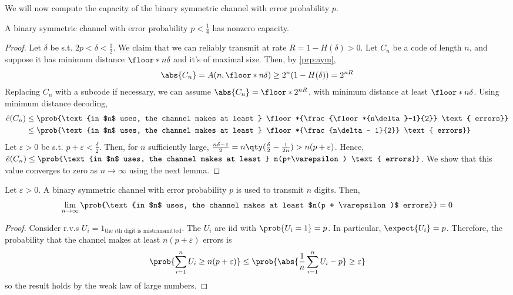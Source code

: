 We will now compute the capacity of the binary symmetric channel with error probability $p$.

\begin{proposition}
    A binary symmetric channel with error probability $p < \frac{1}{4}$ has nonzero capacity.
\end{proposition}

\begin{proof}
    Let $\delta$ be s.t. $2p < \delta < \frac{1}{2}$.
    We claim that we can reliably transmit at rate $R = 1 - H(\delta) > 0$.
    Let $C_n$ be a code of length $n$, and suppose it has minimum distance $\floor*{n\delta}$ and it's of maximal size.
    Then, by \cref{prp:aym},
    \begin{align*}
        \abs{C_n} = A(n, \floor*{n\delta}) \geq 2^n(1-H(\delta)) = 2^{nR}
    \end{align*}
    Replacing $C_n$ with a subcode if necessary, we can assume $\abs{C_n} = \floor*{2^{nR}}$, with minimum distance at least $\floor*{n\delta}$.
    Using minimum distance decoding,
    \begin{align*}
        \hat e(C_n) &\leq \prob{\text{in $n$ uses, the channel makes at least } \floor*{\frac{\floor*{n\delta}-1}{2}} \text{ errors}} \\
        &\leq \prob{\text{in $n$ uses, the channel makes at least } \floor*{\frac{n\delta - 1}{2}} \text{ errors}}
    \end{align*}
    Let $\varepsilon > 0$ be s.t. $p + \varepsilon < \frac{\delta}{2}$.
    Then, for $n$ sufficiently large, $\frac{n\delta - 1}{2} = n\qty(\frac{\delta}{2} - \frac{1}{2n}) > n(p + \varepsilon)$.
    Hence, $\hat e(C_n) \leq \prob{\text{in $n$ uses, the channel makes at least } n(p+\varepsilon) \text{ errors}}$.
    We show that this value converges to zero as $n \to \infty$ using the next lemma.
\end{proof}

\begin{lemma} \label{lem:9.5}
    Let $\varepsilon > 0$.
    A binary symmetric channel with error probability $p$ is used to transmit $n$ digits.
    Then,
    \begin{align*}
        \lim_{n \to \infty} \prob{\text{in $n$ uses, the channel makes at least $n(p + \varepsilon)$ errors}} = 0
    \end{align*}
\end{lemma}

\begin{proof}
    Consider r.v.s $U_i = 1_\text{the $i$th digit is mistransmitted}$.
    The $U_i$ are iid with $\prob{U_i = 1} = p$.
    In particular, $\expect{U_i} = p$.
    Therefore, the probability that the channel makes at least $n(p + \varepsilon)$ errors is
    \begin{align*}
        \prob{\sum_{i=1}^n U_i \geq n(p + \varepsilon)} \leq \prob{\abs{\frac{1}{n} \sum_{i=1}^n U_i - p} \geq \varepsilon}
    \end{align*}
    so the result holds by the weak law of large numbers.
\end{proof}


